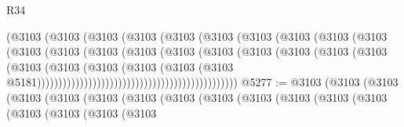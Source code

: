 \begin{lexlean}{R34}
\begin{coremodule}
                                              (@3103
                                                (@3103
                                                  (@3103
                                                    (@3103
                                                      (@3103
                                                        (@3103
                                                          (@3103
                                                            (@3103
                                                              (@3103
                                                                (@3103
                                                                  (@3103
                                                                    (@3103
                                                                      (@3103
                                                                        (@3103
                                                                          (@3103
                                                                            (@3103
                                                                              (@3103
                                                                                (@3103
                                                                                  (@3103
                                                                                    (@3103
                                                                                      (@3103
                                                                                        (@3103
                                                                                          (@3103
                                                                                            (@3103
                                                                                              (@3103
                                                                                                (@3103
                                                                                                  @5181)))))))))))))))))))))))))))))))))))))))))))))))
@5277 := @3103
    (@3103
      (@3103
        (@3103
          (@3103
            (@3103
              (@3103
                (@3103
                  (@3103
                    (@3103
                      (@3103
                        (@3103
                          (@3103
                            (@3103
                              (@3103
                                (@3103
                                  (@3103

\end{coremodule}
\end{lexlean}
